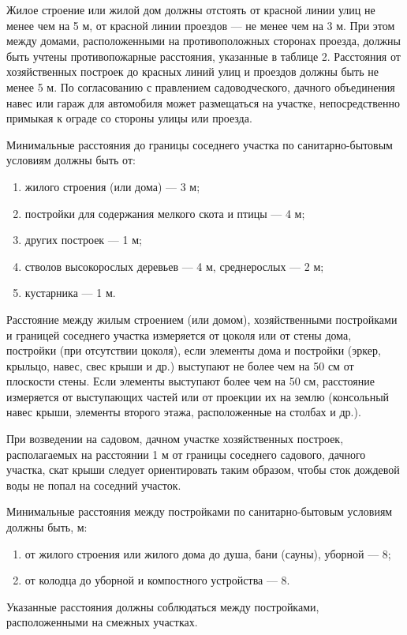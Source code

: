 \documentclass[12pt, twocolumn]{report}
\begin{document}
Жилое строение или жилой дом должны отстоять от красной линии улиц не менее чем на 5 м, от красной линии проездов — не менее чем на 3 м. При этом между
домами, расположенными на противоположных сторонах проезда, должны быть учтены противопожарные расстояния, указанные в таблице 2. Расстояния от хозяйственных построек до красных линий улиц и проездов должны быть не менее 5 м. По согласованию с правлением садоводческого, дачного объединения навес или гараж для автомобиля может размещаться на участке, непосредственно примыкая к ограде со стороны улицы или проезда.

Минимальные расстояния до границы соседнего участка по санитарно-бытовым условиям должны быть от:
\begin{enumerate}
	\item жилого строения (или дома) — 3 м;
	\item постройки для содержания мелкого скота и птицы — 4 м;
	\item других построек — 1 м;
	\item стволов высокорослых деревьев — 4 м, среднерослых — 2 м;
	\item кустарника — 1 м.
\end{enumerate}

Расстояние между жилым строением (или домом), хозяйственными постройками и границей соседнего участка измеряется от цоколя или от стены дома, постройки (при
отсутствии цоколя), если элементы дома и постройки (эркер, крыльцо, навес, свес крыши и др.) выступают не более чем на 50 см от плоскости стены. Если элементы
выступают более чем на 50 см, расстояние измеряется от выступающих частей или от проекции их на землю (консольный навес крыши, элементы второго этажа, расположенные на столбах и др.).

При возведении на садовом, дачном участке хозяйственных построек, располагаемых на расстоянии 1 м от границы соседнего садового, дачного участка, скат
крыши следует ориентировать таким образом, чтобы сток дождевой воды не попал на соседний участок.


Минимальные расстояния между постройками по санитарно-бытовым условиям должны быть, м:
\begin{enumerate}
	\item от жилого строения или жилого дома до душа, бани (сауны), уборной — 8;
	\item от колодца до уборной и компостного устройства — 8.
\end{enumerate}

Указанные расстояния должны соблюдаться между постройками, расположенными на смежных участках.
\end{document}
